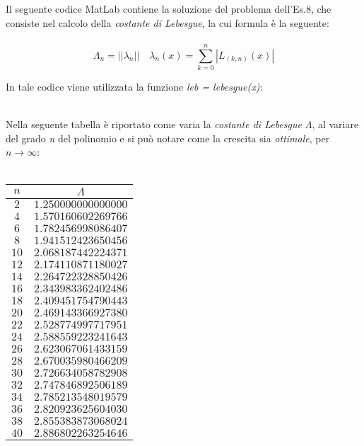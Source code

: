 Il seguente codice MatLab contiene la soluzione del problema dell'Es.8, che consiste nel calcolo della \textit{costante di Lebesgue}, la cui formula è la seguente:\\\
	\[
		\Lambda_n = ||\lambda_n|| \quad \lambda_n(x) = \sum_{k=0}^{n} |L_{(k,n)}(x)|
	\]
	
In tale codice viene utilizzata la funzione \textit{leb = lebesgue(x)}:\\\
	
Nella seguente tabella è riportato come varia la \textit{costante di Lebesgue} $\Lambda$, al variare del grado \textit{n} del polinomio e si può notare come la crescita sia \textit{ottimale}, per $n\rightarrow\infty$:\\\
	\begin{center}
		\begin{tabular}{|c|c|}
			\hline
				$n$ & $\Lambda$ \\
    		\hline
    			$2$  & $1.250000000000000$ \\ 
    			$4$  & $1.570160602269766$ \\ 
    			$6$  & $1.782456998086407$ \\ 
    			$8$  & $1.941512423650456$ \\ 
    			$10$ & $2.068187442224371$ \\ 
    			$12$ & $2.174110871180027$ \\ 
    			$14$ & $2.264722328850426$ \\ 
    			$16$ & $2.343983362402486$ \\ 
   				$18$ & $2.409451754790443$ \\ 
    			$20$ & $2.469143366927380$ \\ 
    			$22$ & $2.528774997717951$ \\ 
    			$24$ & $2.588559223241643$ \\ 
    			$26$ & $2.623067061433159$ \\ 
    			$28$ & $2.670035980466209$ \\ 
    			$30$ & $2.726634058782908$ \\ 
    			$32$ & $2.747846892506189$ \\ 
    			$34$ & $2.785213548019579$ \\ 
    			$36$ & $2.820923625604030$ \\ 
    			$38$ & $2.855383873068024$ \\ 
    			$40$ & $2.886802263254646$ \\ 
			\hline
		\end{tabular}
	\end{center}
